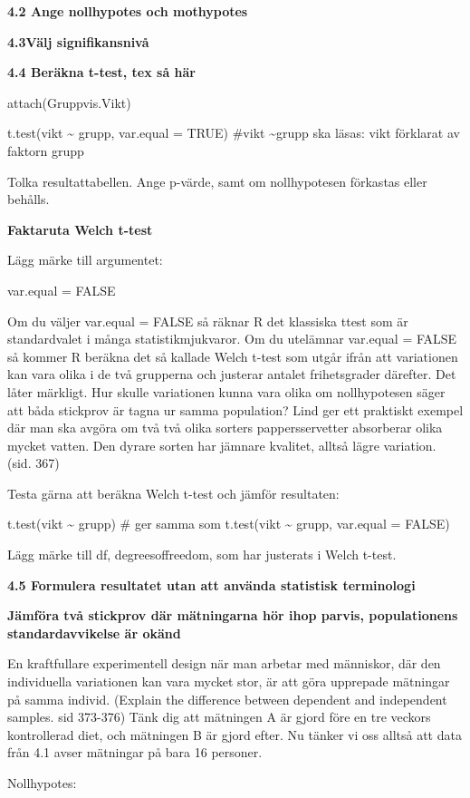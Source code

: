 \documentclass[
  letterpaper,
  DIV=11,
  numbers=noendperiod]{scrartcl}
\begin{document}
\textbf{4.2 Ange nollhypotes och mothypotes}

\textbf{4.3Välj signifikansnivå}

\textbf{4.4 Beräkna t-test, tex så här}

attach(Gruppvis.Vikt)

t.test(vikt \textasciitilde{} grupp, var.equal = TRUE) \#vikt
\textasciitilde grupp ska läsas: vikt förklarat av faktorn grupp

Tolka resultattabellen. Ange p-värde, samt om nollhypotesen förkastas
eller behålls.

\textbf{Faktaruta Welch t-test}

Lägg märke till argumentet:

var.equal = FALSE

Om du väljer var.equal = FALSE så räknar R det klassiska ttest som är
standardvalet i många statistikmjukvaror. Om du utelämnar var.equal =
FALSE så kommer R beräkna det så kallade Welch t-test som utgår ifrån
att variationen kan vara olika i de två grupperna och justerar antalet
frihetsgrader därefter. Det låter märkligt. Hur skulle variationen kunna
vara olika om nollhypotesen säger att båda stickprov är tagna ur samma
population? Lind ger ett praktiskt exempel där man ska avgöra om två två
olika sorters pappersservetter absorberar olika mycket vatten. Den
dyrare sorten har jämnare kvalitet, alltså lägre variation. (sid. 367)

Testa gärna att beräkna Welch t-test och jämför resultaten:

t.test(vikt \textasciitilde{} grupp) \# ger samma som t.test(vikt
\textasciitilde{} grupp, var.equal = FALSE)

Lägg märke till df, degreesoffreedom, som har justerats i Welch t-test.

\textbf{4.5 Formulera resultatet utan att använda statistisk
terminologi}

\textbf{Jämföra två stickprov där mätningarna hör ihop parvis,
populationens standardavvikelse är okänd}

En kraftfullare experimentell design när man arbetar med människor, där
den individuella variationen kan vara mycket stor, är att göra upprepade
mätningar på samma individ. (Explain the difference between dependent
and independent samples. sid 373-376) Tänk dig att mätningen A är gjord
före en tre veckors kontrollerad diet, och mätningen B är gjord efter.
Nu tänker vi oss alltså att data från 4.1 avser mätningar på bara 16
personer.

Nollhypotes:
\end{document}
